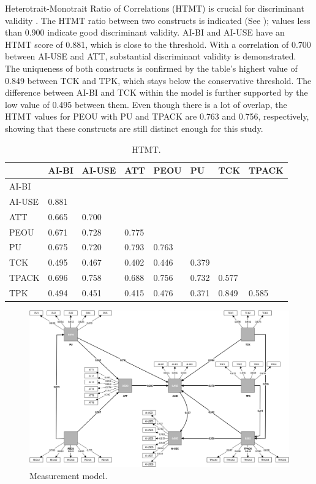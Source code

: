 \documentclass[english]{textolivre}
\begin{document}
Heterotrait-Monotrait Ratio of Correlations (HTMT) is crucial for discriminant validity \cite{habibi2022beliefs,vaithilingam2024robustness}. The HTMT ratio between two constructs is indicated (See ); values less than 0.900 indicate good discriminant validity. AI-BI and AI-USE have an HTMT score of 0.881, which is close to the threshold. With a correlation of 0.700 between AI-USE and ATT, substantial discriminant validity is demonstrated. The uniqueness of both constructs is confirmed by the table’s highest value of 0.849 between TCK and TPK, which stays below the conservative threshold. The difference between AI-BI and TCK within the model is further supported by the low value of 0.495 between them. Even though there is a lot of overlap, the HTMT values for PEOU with PU and TPACK are 0.763 and 0.756, respectively, showing that these constructs are still distinct enough for this study.

\begin{table}[h!]
\centering
\begin{threeparttable}
\caption{HTMT.}
\label{tbl4}
\centering
\begin{tabular}{llllllll}
\toprule
& AI-BI & AI-USE & ATT & PEOU & PU & TCK & TPACK  \\
\midrule
AI-BI & & & & & & & \\
AI-USE & 0.881 & & & & & & \\
ATT & 0.665 & 0.700 & & & & & \\
PEOU & 0.671 & 0.728 & 0.775 & & & & \\
PU & 0.675 & 0.720 & 0.793 & 0.763 & & & \\
TCK & 0.495 & 0.467 & 0.402 & 0.446 & 0.379 & & \\
TPACK & 0.696 & 0.758 & 0.688 & 0.756 & 0.732 & 0.577 & \\
TPK & 0.494 & 0.451 & 0.415 & 0.476 & 0.371 & 0.849 & 0.585  \\
\bottomrule
\end{tabular}
\end{threeparttable}
\end{table}

\begin{figure}
    \centering
    \begin{minipage}{0.85\linewidth}
    \includegraphics[width=\linewidth]{Fig2.png}
    \caption{Measurement model.}
    \label{fig2}
    \end{minipage}
\end{figure}
\end{document}
